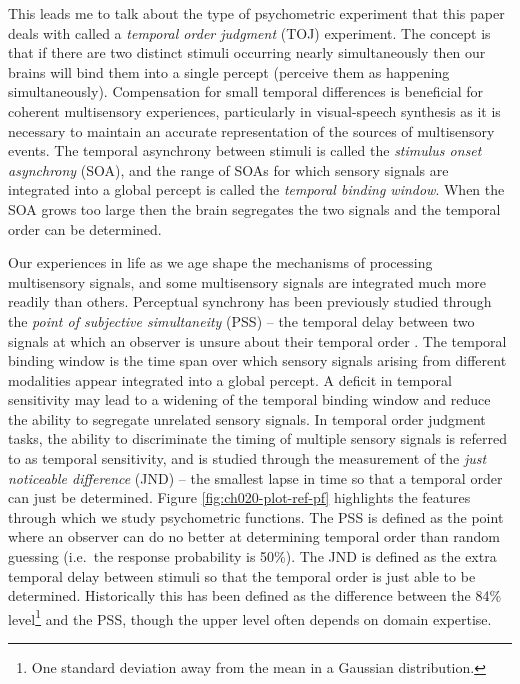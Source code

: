 \documentclass[11pt, oneside, openany]{scrbook}
\begin{document}
This leads me to talk about the type of psychometric experiment that this paper deals with called a \emph{temporal order judgment} (TOJ) experiment. The concept is that if there are two distinct stimuli occurring nearly simultaneously then our brains will bind them into a single percept (perceive them as happening simultaneously). Compensation for small temporal differences is beneficial for coherent multisensory experiences, particularly in visual-speech synthesis as it is necessary to maintain an accurate representation of the sources of multisensory events. The temporal asynchrony between stimuli is called the \emph{stimulus onset asynchrony} (SOA), and the range of SOAs for which sensory signals are integrated into a global percept is called the \emph{temporal binding window}. When the SOA grows too large then the brain segregates the two signals and the temporal order can be determined.

Our experiences in life as we age shape the mechanisms of processing multisensory signals, and some multisensory signals are integrated much more readily than others. Perceptual synchrony has been previously studied through the \emph{point of subjective simultaneity} (PSS) -- the temporal delay between two signals at which an observer is unsure about their temporal order \citep{stone2001now}. The temporal binding window is the time span over which sensory signals arising from different modalities appear integrated into a global percept. A deficit in temporal sensitivity may lead to a widening of the temporal binding window and reduce the ability to segregate unrelated sensory signals. In temporal order judgment tasks, the ability to discriminate the timing of multiple sensory signals is referred to as temporal sensitivity, and is studied through the measurement of the \emph{just noticeable difference} (JND) -- the smallest lapse in time so that a temporal order can just be determined. Figure \ref{fig:ch020-plot-ref-pf} highlights the features through which we study psychometric functions. The PSS is defined as the point where an observer can do no better at determining temporal order than random guessing (i.e.~the response probability is 50\%). The JND is defined as the extra temporal delay between stimuli so that the temporal order is just able to be determined. Historically this has been defined as the difference between the 84\% level\footnote{One standard deviation away from the mean in a Gaussian distribution.} and the PSS, though the upper level often depends on domain expertise.
\end{document}
